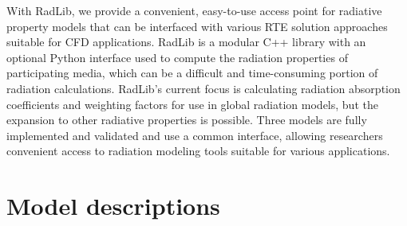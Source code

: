 \documentclass[preprint,12pt]{elsarticle}
\begin{document}
With RadLib, we provide a convenient, easy-to-use access point for radiative property models that can be interfaced with various RTE solution approaches suitable for CFD applications. RadLib is a modular C++ library with an optional Python interface used to compute the radiation properties of participating media, which can be a difficult and time-consuming portion of radiation calculations. RadLib's current focus is calculating radiation absorption coefficients and weighting factors for use in global radiation models, but the expansion to other radiative properties is possible. Three models are fully implemented and validated and use a common interface, allowing researchers convenient access to radiation modeling tools suitable for various applications.


\section{Model descriptions} \label{s:models}
\end{document}
